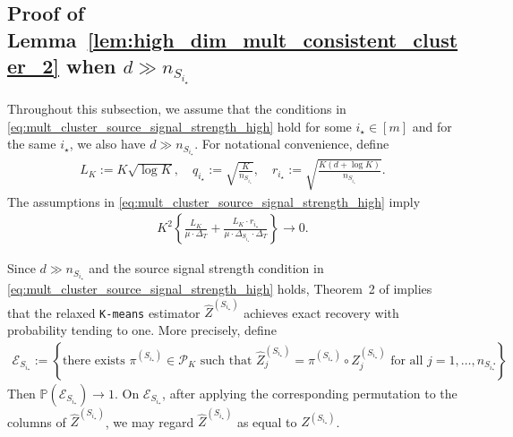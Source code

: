 \documentclass[10pt]{article}
\newcommand{\wh}{\widehat}
\newcommand{\trg}{T}
\newcommand{\DeltaT}{\Delta_{\trg}}
\newcommand{\src}{S}
\newcommand{\nSm}[1]{n_{\src_{#1}}}
\newcommand{\Zsrcm}[1]{Z^{(\src_{#1})}}
\newcommand{\DeltaSm}[1]{\Delta_{\src_{#1}}}
\begin{document}
\subsection{Proof of Lemma~\ref{lem:high_dim_mult_consistent_cluster_2} when $d\gg \nSm{i_\star}$}

Throughout this subsection, we assume that the conditions in \eqref{eq:mult_cluster_source_signal_strength_high} hold for some $i_\star\in[m]$ and for the same $i_\star$, we also have $d\gg \nSm{i_\star}$. For notational convenience, define
\begin{align}
\label{eq:source_high_dim_aux_quantities}
    L_K:=K\sqrt{\log K}, \quad q_{i_\star}:=\sqrt{\frac{K}{\nSm{i_\star}}}, \quad r_{i_\star}:=\sqrt{\frac{K(d+\log K)}{\nSm{i_\star}}}.
\end{align}
The assumptions in \eqref{eq:mult_cluster_source_signal_strength_high} imply
\begin{align}
\label{eq:source_high_dim_uniform_pair_condition}
    K^2\left\{\frac{L_K}{\mu\cdot\DeltaT}+\frac{L_K\cdot r_{i_\star}}{\mu\cdot\DeltaSm{i_\star}\cdot\DeltaT}\right\}\to 0.
\end{align}

Since $d\gg \nSm{i_\star}$ and the source signal strength condition in \eqref{eq:mult_cluster_source_signal_strength_high} holds, Theorem~2 of \citet{giraud2019partial} implies that the relaxed \texttt{K-means} estimator $\wh Z^{(\src_{i_\star})}$ achieves exact recovery with probability tending to one. More precisely, define
\begin{align}
\label{eq:source_high_dim_exact_recovery_event}
    \mathcal E_{\src_{i_\star}}:=\left\{\mbox{there exists $\pi^{(\src_{i_\star})}\in\mathcal P_K$ such that $\wh Z^{(\src_{i_\star})}_j=\pi^{(\src_{i_\star})}\circ\Zsrcm{i_\star}_j$ for all $j=1,\ldots,\nSm{i_\star}$}\right\}.
\end{align}
Then $\mathbb P(\mathcal E_{\src_{i_\star}})\to 1$. On $\mathcal E_{\src_{i_\star}}$, after applying the corresponding permutation to the columns of $\wh Z^{(\src_{i_\star})}$, we may regard $\wh Z^{(\src_{i_\star})}$ as equal to $\Zsrcm{i_\star}$.
\end{document}
